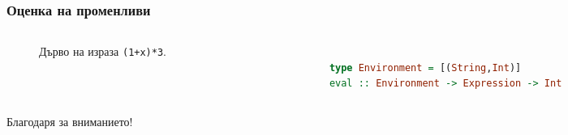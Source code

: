 \documentclass{beamer}
\begin{document}
\begin{frame}[fragile]
  \frametitle{Оценка на променливи}


\begin{columns}[t]
  \begin{column}{0.3\textwidth}

    \begin{figure}
      \centering
      \caption{Дърво на израза \texttt{(1+x)*3}.}
      \label{fig:treeexpr}
      \end{figure}
      

  \end{column}
  \begin{column}{0.7\textwidth}

\begin{lstlisting}[basicstyle=\small,language=Haskell]

type Environment = [(String,Int)]
eval :: Environment -> Expression -> Int     

\end{lstlisting}

  \end{column}
\end{columns}

\end{frame}  

\begin{frame}
  \centerline{Благодаря за вниманието!}
\end{frame}
\end{document}
